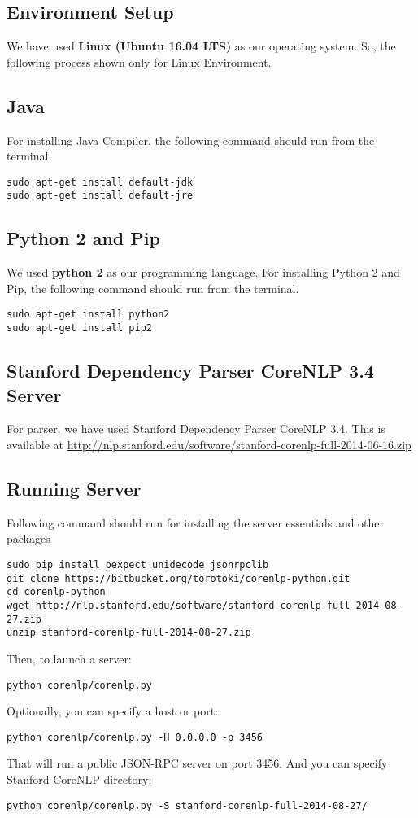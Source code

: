 \documentclass[document.tex]{subfiles}
\begin{document}
	\begin{appendices}
		\chapter{Environment Setup}
		We have used \textbf{Linux (Ubuntu 16.04 LTS)} as our operating system. So, the following process shown only for Linux Environment.
		\section{Java}
		For installing Java Compiler, the following command should run from the terminal.
		\begin{center}
			\begin{lstlisting}
sudo apt-get install default-jdk
sudo apt-get install default-jre
			\end{lstlisting}
		\end{center}
		
		\section{Python 2 and Pip}
		We used \textbf{python 2} as our programming language. For installing Python 2 and Pip, the following command should run from the terminal.
		\begin{center}
			\begin{lstlisting}
sudo apt-get install python2
sudo apt-get install pip2
			\end{lstlisting}
		\end{center}
		
		\section{Stanford Dependency Parser CoreNLP 3.4 Server}
		For parser, we have used Stanford Dependency Parser CoreNLP 3.4. This is available at \url{http://nlp.stanford.edu/software/stanford-corenlp-full-2014-06-16.zip}
		
		\section{Running Server}
		Following command should run for installing the server essentials and other packages
		\begin{lstlisting}
sudo pip install pexpect unidecode jsonrpclib 
git clone https://bitbucket.org/torotoki/corenlp-python.git
cd corenlp-python
wget http://nlp.stanford.edu/software/stanford-corenlp-full-2014-08-27.zip
unzip stanford-corenlp-full-2014-08-27.zip
		\end{lstlisting}
Then, to launch a server:
		\begin{lstlisting}
python corenlp/corenlp.py
		\end{lstlisting}
Optionally, you can specify a host or port:
		\begin{lstlisting}
python corenlp/corenlp.py -H 0.0.0.0 -p 3456
		\end{lstlisting}
That will run a public JSON-RPC server on port 3456.
And you can specify Stanford CoreNLP directory:
		\begin{lstlisting}
python corenlp/corenlp.py -S stanford-corenlp-full-2014-08-27/
		\end{lstlisting}

\end{appendices}
\end{document}
